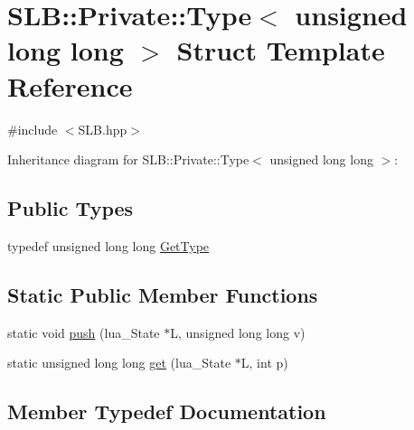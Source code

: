 \hypertarget{structSLB_1_1Private_1_1Type_3_01unsigned_01long_01long_01_4}{}\section{S\+LB\+:\+:Private\+:\+:Type$<$ unsigned long long $>$ Struct Template Reference}
\label{structSLB_1_1Private_1_1Type_3_01unsigned_01long_01long_01_4}


{\ttfamily \#include $<$S\+L\+B.\+hpp$>$}



Inheritance diagram for S\+LB\+:\+:Private\+:\+:Type$<$ unsigned long long $>$\+:
\subsection*{Public Types}
\begin{DoxyCompactItemize}
\item 
typedef unsigned long long \hyperlink{structSLB_1_1Private_1_1Type_3_01unsigned_01long_01long_01_4_a5f57090379bd2f0d44ba5b70e934d2fe}{Get\+Type}
\end{DoxyCompactItemize}
\subsection*{Static Public Member Functions}
\begin{DoxyCompactItemize}
\item 
static void \hyperlink{structSLB_1_1Private_1_1Type_3_01unsigned_01long_01long_01_4_a47a24c4081bf5464fc853c111365fd99}{push} (lua\+\_\+\+State $\ast$L, unsigned long long v)
\item 
static unsigned long long \hyperlink{structSLB_1_1Private_1_1Type_3_01unsigned_01long_01long_01_4_a19149d4a8022effc0b1402617648a07a}{get} (lua\+\_\+\+State $\ast$L, int p)
\end{DoxyCompactItemize}


\subsection{Member Typedef Documentation}

